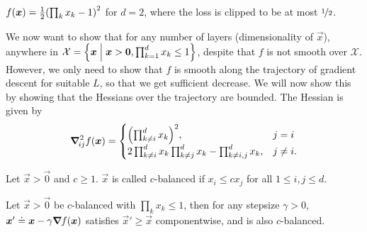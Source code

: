 \begin{marginfigure}
    \centering
    \caption{$f(\vec{x}) = \frac{1}{2} \lft( \prod_k x_k - 1 \rgt)^2$ for $d=2$, where the loss is clipped to be at most $\nicefrac{1}{2}$.}
    \label{fig:deep-linear-loss-landscape}
\end{marginfigure}

We now want to show that for any number of layers (\ie dimensionality of $\vec{x}$), anywhere in
$\mathcal{X} = \lft\{ \vec{x} \;\middle|\; \vec{x} > \vec{0}, \prod_{k=1}^{d} x_k \leq 1 \rgt\}$,
despite that $f$ is not smooth over $\mathcal{X}$. However, we only need to show that $f$ is smooth
along the trajectory of gradient descent for suitable $L$, so that we get sufficient decrease. We
will now show this by showing that the Hessians over the trajectory are bounded. The Hessian is
given by \[
    \hess{f(\vec{x})}{ij} = \begin{cases}
        \lft( \prod_{k\neq i}^d x_k \rgt)^2,                                         & j = i     \\
        2 \prod_{k\neq i}^{d} x_k \prod_{k\neq j}^d x_k - \prod_{k\neq i,j}^{d} x_k, & j \neq i.
    \end{cases}
\]

\begin{definition}[$c$-balanced.]
    Let $\vec{x} > \vec{0}$ and $c \geq 1$. $\vec{x}$ is called $c$-balanced if $x_i \leq cx_j$ for
    all $1 \leq i,j \leq d$.
\end{definition}

\begin{lemma}
    Let $\vec{x} > \vec{0}$ be $c$-balanced with $\prod_k x_k \leq 1$, then for any stepsize
    $\gamma > 0$, $\bm{x}' \doteq \bm{x} - \gamma \bm{\nabla}_{\! } f(\bm{x})$ satisfies $\vec{x}' \geq
        \vec{x}$ componentwise, and is also $c$-balanced.
\end{lemma}

